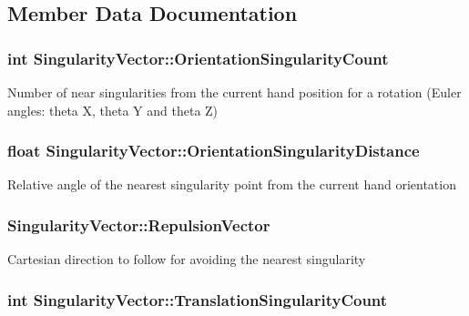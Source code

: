 \subsection{Member Data Documentation}
\hypertarget{struct_singularity_vector_a7ea72e4a459d41c935135c581e6763b1}{
\subsubsection[{Orientation\-Singularity\-Count}]{\setlength{\rightskip}{0pt plus 5cm}int Singularity\-Vector\-::\-Orientation\-Singularity\-Count}}\label{struct_singularity_vector_a7ea72e4a459d41c935135c581e6763b1}
Number of near singularities from the current hand position for a rotation (Euler angles\-: theta X, theta Y and theta Z) \hypertarget{struct_singularity_vector_ae04b0dd5f44b2d696d36860ecb7b9f35}{
\subsubsection[{Orientation\-Singularity\-Distance}]{\setlength{\rightskip}{0pt plus 5cm}float Singularity\-Vector\-::\-Orientation\-Singularity\-Distance}}\label{struct_singularity_vector_ae04b0dd5f44b2d696d36860ecb7b9f35}
Relative angle of the nearest singularity point from the current hand orientation \hypertarget{struct_singularity_vector_adc7115ff6fe262ef37a1bff2ebbdbfee}{
\subsubsection[{Repulsion\-Vector}]{ Singularity\-Vector\-::\-Repulsion\-Vector}}\label{struct_singularity_vector_adc7115ff6fe262ef37a1bff2ebbdbfee}
Cartesian direction to follow for avoiding the nearest singularity \hypertarget{struct_singularity_vector_ac65570b58281f94cea000ede75de19ae}{
\subsubsection[{Translation\-Singularity\-Count}]{\setlength{\rightskip}{0pt plus 5cm}int Singularity\-Vector\-::\-Translation\-Singularity\-Count}}\label{struct_singularity_vector_ac65570b58281f94cea000ede75de19ae}
